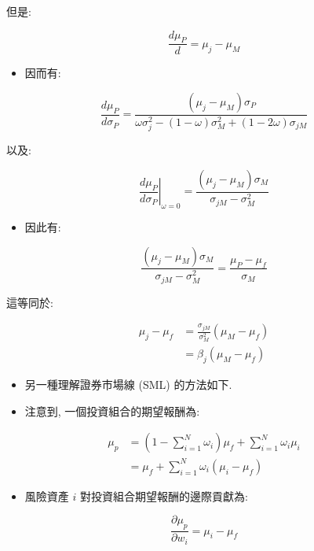 \documentclass[letterpaper]{article}
\begin{document}
		但是:
		
		$$
		\frac{d \mu_{P}}{d}=\mu_{j}-\mu_{M}
		$$
		
		
		\begin{itemize}
			\item 因而有: 
		\end{itemize}
		
		$$
		\frac{d \mu_{P}}{d \sigma_{P}}=\frac{\left (\mu_{j}-\mu_{M}\right) \sigma_{P}}{\omega \sigma_{j}^{2}- (1-\omega) \sigma_{M}^{2}+ (1-2 \omega) \sigma_{j M}}
		$$
		
		以及: 
		
		$$
		\left.\frac{d \mu_{P}}{d \sigma_{P}}\right|_{\omega=0}=\frac{\left (\mu_{j}-\mu_{M}\right) \sigma_{M}}{\sigma_{j M}-\sigma_{M}^{2}}
		$$
		
		\begin{itemize}
			\item 因此有: 
		\end{itemize}
		
		$$
		\frac{\left (\mu_{j}-\mu_{M}\right) \sigma_{M}}{\sigma_{j M}-\sigma_{M}^{2}}=\frac{\mu_{P}-\mu_{f}}{\sigma_{M}}
		$$
		
		這等同於: 
		
		$$
		\begin{aligned}
			\mu_{j}-\mu_{f} & =\frac{\sigma_{j M}}{\sigma_{M}^{2}}\left (\mu_{M}-\mu_{f}\right) \\
			& =\beta_{j}\left (\mu_{M}-\mu_{f}\right) 
		\end{aligned}
		$$
		
		\begin{itemize}
			\item 另一種理解證券市場線 (SML) 的方法如下. 
			\item 注意到, 一個投資組合的期望報酬為: 
		\end{itemize}
		
		
		$$
		\begin{aligned}
			\mu_{p} & =\left (1-\sum_{i=1}^{N} \omega_{i}\right) \mu_{f}+\sum_{i=1}^{N} \omega_{i} \mu_{i} \\
			& =\mu_{f}+\sum_{i=1}^{N} \omega_{i}\left (\mu_{i}-\mu_{f}\right) 
		\end{aligned}
		$$
		
		\begin{itemize}
			\item 風險資產 $i$ 對投資組合期望報酬的邊際貢獻為: 
		\end{itemize}
		
		
		$$
		\frac{\partial \mu_{p}}{\partial w_{i}}=\mu_{i}-\mu_{f}
		$$
		
\end{document}
